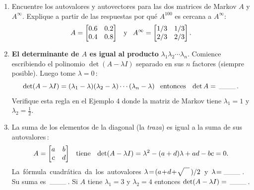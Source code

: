 \documentclass[12pt,a4paper]{article}
\newcommand\1{\mbox{\,\vrule height-0.8pt depth1.0pt width2pc\,}}
\newcommand\2{\mbox{\,\vrule height-0.8pt depth1.0pt width1pc\,}}
\newcommand{\la}{\lambda}
\newcommand{\half}{\frac{1}{2}}
\begin{document}
\begin{enumerate}
\item Encuentre los autovalores y autovectores para las dos matrices de Markov $A$ y $A^\infty$. Explique a partir de las respuestas por qué $A^{100}$ es cercana a $A^\infty$:
%
$$
A=
\begin{bmatrix} 0.6&0.2\\ 0.4&0.8\end{bmatrix}
\quad \hbox{y} \quad
A^\infty=
\begin{bmatrix} 1/3&1/3\\ 2/3&2/3\end{bmatrix}.
$$

\item {\bf El determinante de $A$ es igual al producto} $\la_1  \la_2\dotsb \la_n$. Comience escribiendo el polinomio $\det (A-\la I)$  separado en sus $n$ factores (siempre posible). Luego tome $\la=0$\,:
$$
\det(A-\la I)=(\la_1-\la)
(\la_2-\la)\dotsb (\la_n-\la)
\quad\hbox{entonces}\quad\det A=\1.
$$
Verifique esta regla en el Ejemplo 4 donde la matriz de Markov tiene $\la_1 =1$ y $\la_2=\half$.

\item La suma de los elementos de la diagonal (la \emph{traza}) es igual a la suma de sus autovalores\,:
$$
%
A=\begin{bmatrix} a&b\\ c&d\end{bmatrix}
\quad\hbox{tiene}\quad
\det(A-\la I)=
\la^2-(a+d)\la+ad-bc=0.
$$
%
La~fórmula~cuadrática~da~los~autovalores
$\la\!=\!(a\!+\!d\!+\!\sqrt{\quad\mathstrut}\,)
/2$~y~$\la\!=\!\1$.\linebreak
Su suma es $\1$. Si $A$ tiene $\la_1=3$ y $\la_2=4$ entonces $\det (A-\la I)=\1$.


\end{enumerate}
\end{document}
